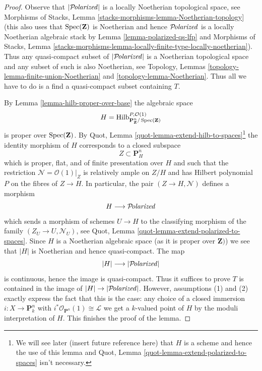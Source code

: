 \begin{proof}
Observe that $|\mathcal{P}\!\mathit{olarized}|$ is a locally Noetherian topological
space, see Morphisms of Stacks, Lemma
\ref{stacks-morphisms-lemma-Noetherian-topology}
(this also uses that $\mathop{\mathrm{Spec}}(\mathbf{Z})$ is Noetherian and
hence $\mathcal{P}\!\mathit{olarized}$ is a locally Noetherian algebraic stack
by Lemma \ref{lemma-polarized-qs-lfp} and
Morphisms of Stacks, Lemma
\ref{stacks-morphisms-lemma-locally-finite-type-locally-noetherian}).
Thus any quasi-compact subset of $|\mathcal{P}\!\mathit{olarized}|$ is
a Noetherian topological space and any subset of such is
also Noetherian, see
Topology, Lemmas \ref{topology-lemma-finite-union-Noetherian} and
\ref{topology-lemma-Noetherian}.
Thus all we have to do is a find a quasi-compact subset
containing $T$.

\medskip\noindent
By Lemma \ref{lemma-hilb-proper-over-base} the algebraic space
$$
H =
\mathrm{Hilb}^{P, \mathcal{O}(1)}_{\mathbf{P}^n_\mathbf{Z}/\mathop{\mathrm{Spec}}(\mathbf{Z})}
$$
is proper over $\mathop{\mathrm{Spec}}(\mathbf{Z})$. By
Quot, Lemma \ref{quot-lemma-extend-hilb-to-spaces}\footnote{We will see
later (insert future reference here) that $H$ is a scheme and hence the
use of this lemma and Quot, Lemma \ref{quot-lemma-extend-polarized-to-spaces}
isn't necessary.} the identity morphism of $H$ corresponds
to a closed subspace
$$
Z \subset \mathbf{P}^n_H
$$
which is proper, flat, and of finite presentation over $H$ and
such that the restriction $\mathcal{N} = \mathcal{O}(1)|_Z$
is relatively ample on $Z/H$ and has Hilbert polynomial $P$
on the fibres of $Z \to H$. In particular, the pair $(Z \to H, \mathcal{N})$
defines a morphism
$$
H \longrightarrow \mathcal{P}\!\mathit{olarized}
$$
which sends a morphism of schemes $U \to H$ to the classifying morphism
of the family $(Z_U \to U, \mathcal{N}_U)$, see
Quot, Lemma \ref{quot-lemma-extend-polarized-to-spaces}.
Since $H$ is a Noetherian algebraic space
(as it is proper over $\mathbf{Z})$)
we see that $|H|$ is Noetherian and hence quasi-compact. The map
$$
|H| \longrightarrow |\mathcal{P}\!\mathit{olarized}|
$$
is continuous, hence the image is quasi-compact.
Thus it suffices to prove $T$ is contained
in the image of $|H| \to |\mathcal{P}\!\mathit{olarized}|$.
However, assumptions (1) and (2) exactly express the fact
that this is the case: any choice of a closed immersion
$i : X \to \mathbf{P}^n_k$ with
$i^*\mathcal{O}_{\mathbf{P}^n}(1) \cong \mathcal{L}$ we get a
$k$-valued point of $H$ by the moduli interpretation of $H$.
This finishes the proof of the lemma.
\end{proof}






